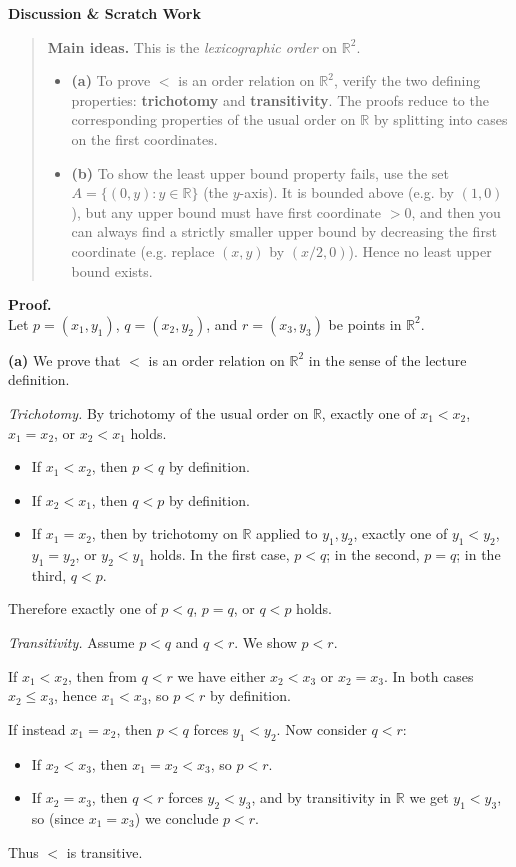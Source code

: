 \documentclass[12pt]{article}
\newenvironment{scratch}{%
  \par\smallskip
  \noindent\textbf{Discussion \& Scratch Work}\begin{quote}\small
}{%
  \end{quote}\smallskip
}
\begin{document}
\begin{scratch}
\textbf{Main ideas.}
This is the \emph{lexicographic order} on $\mathbb{R}^2$.

\begin{itemize}
\item \textbf{(a)} To prove $<$ is an order relation on $\mathbb{R}^2$, verify the two defining properties:
\textbf{trichotomy} and \textbf{transitivity}. The proofs reduce to the corresponding properties of the usual order on $\mathbb{R}$ by splitting into cases on the first coordinates.
\item \textbf{(b)} To show the least upper bound property fails, use the set
$A=\{(0,y): y\in\mathbb{R}\}$ (the $y$-axis). It is bounded above (e.g. by $(1,0)$), but any upper bound must have first coordinate $>0$, and then you can always find a strictly smaller upper bound by decreasing the first coordinate (e.g. replace $(x,y)$ by $(x/2,0)$). Hence no least upper bound exists.
\end{itemize}
\end{scratch}

\textbf{Proof.}\\
Let $p=(x_1,y_1)$, $q=(x_2,y_2)$, and $r=(x_3,y_3)$ be points in $\mathbb{R}^2$.

\medskip
\textbf{(a)} We prove that $<$ is an order relation on $\mathbb{R}^2$ in the sense of the lecture definition.

\emph{Trichotomy.} By trichotomy of the usual order on $\mathbb{R}$, exactly one of $x_1<x_2$, $x_1=x_2$, or $x_2<x_1$ holds.

\begin{itemize}
\item If $x_1<x_2$, then $p<q$ by definition.
\item If $x_2<x_1$, then $q<p$ by definition.
\item If $x_1=x_2$, then by trichotomy on $\mathbb{R}$ applied to $y_1,y_2$, exactly one of $y_1<y_2$, $y_1=y_2$, or $y_2<y_1$ holds. In the first case, $p<q$; in the second, $p=q$; in the third, $q<p$.
\end{itemize}
Therefore exactly one of $p<q$, $p=q$, or $q<p$ holds.

\emph{Transitivity.} Assume $p<q$ and $q<r$. We show $p<r$.

If $x_1<x_2$, then from $q<r$ we have either $x_2<x_3$ or $x_2=x_3$. In both cases $x_2\le x_3$, hence $x_1<x_3$, so $p<r$ by definition.

If instead $x_1=x_2$, then $p<q$ forces $y_1<y_2$. Now consider $q<r$:
\begin{itemize}
\item If $x_2<x_3$, then $x_1=x_2<x_3$, so $p<r$.
\item If $x_2=x_3$, then $q<r$ forces $y_2<y_3$, and by transitivity in $\mathbb{R}$ we get $y_1<y_3$, so (since $x_1=x_3$) we conclude $p<r$.
\end{itemize}
Thus $<$ is transitive.
\end{document}
